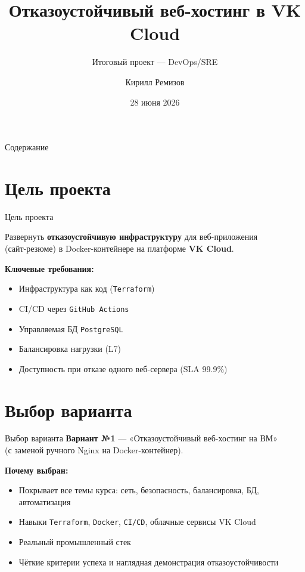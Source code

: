 \documentclass[10pt,aspectratio=169]{beamer}
\title{Отказоустойчивый веб-хостинг в VK Cloud}
\subtitle{Итоговый проект --- DevOps/SRE}
\author{Кирилл Ремизов}
\institute{ННГУ им. Лобачевского}
\date{28 июня 2026}
\begin{document}
{
\begin{frame}[plain]
  \titlepage
\end{frame}
}

\begin{frame}{Содержание}
  \tableofcontents
\end{frame}

\section{Цель проекта}

\begin{frame}{Цель проекта}
  \begin{block}{}
    Развернуть \textbf{отказоустойчивую инфраструктуру} для веб-приложения \\
    (сайт-резюме) в Docker-контейнере на платформе \textbf{VK Cloud}.
  \end{block}

  \vspace{0.4cm}
  \textbf{Ключевые требования:}
  \begin{itemize}
    \item Инфраструктура как код (\texttt{Terraform})
    \item CI/CD через \texttt{GitHub Actions}
    \item Управляемая БД \texttt{PostgreSQL}
    \item Балансировка нагрузки (L7)
    \item Доступность при отказе одного веб-сервера (SLA 99.9\%)
  \end{itemize}
\end{frame}

\section{Выбор варианта}

\begin{frame}{Выбор варианта}
  \textbf{Вариант №1} --- «Отказоустойчивый веб-хостинг на ВМ» \\
  (с заменой ручного Nginx на Docker-контейнер).

  \vspace{0.4cm}
  \textbf{Почему выбран:}
  \begin{itemize}
    \item Покрывает все темы курса: сеть, безопасность, балансировка, БД, автоматизация
    \item Навыки \texttt{Terraform}, \texttt{Docker}, \texttt{CI/CD}, облачные сервисы VK Cloud
    \item Реальный промышленный стек
    \item Чёткие критерии успеха и наглядная демонстрация отказоустойчивости
  \end{itemize}
\end{frame}
\end{document}
